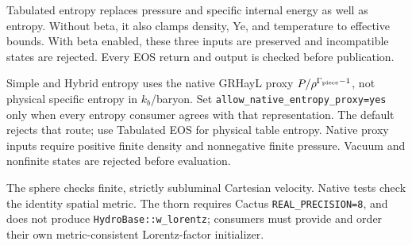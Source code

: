 \documentclass{article}
\begin{document}
Tabulated entropy replaces pressure and specific internal energy as well as
entropy. Without beta, it also clamps density, Ye, and temperature to effective
bounds. With beta enabled, these three inputs are preserved and incompatible
states are rejected. Every EOS return and output is checked before publication.

Simple and Hybrid entropy uses the native GRHayL proxy
$P/\rho^{\Gamma_{\rm piece}-1}$, not physical specific entropy in
$k_b$/baryon. Set \texttt{allow\_native\_entropy\_proxy=yes} only when every
entropy consumer agrees with that representation. The default rejects that
route; use Tabulated EOS for physical table entropy. Native proxy inputs
require positive finite density and nonnegative finite pressure. Vacuum and
nonfinite states are rejected before evaluation.

The sphere checks finite, strictly subluminal Cartesian velocity. Native tests
check the identity spatial metric. The thorn requires Cactus
\texttt{REAL\_PRECISION=8}, and does not produce
\texttt{HydroBase::w\_lorentz}; consumers must provide and order their own
metric-consistent Lorentz-factor initializer.

\end{document}
